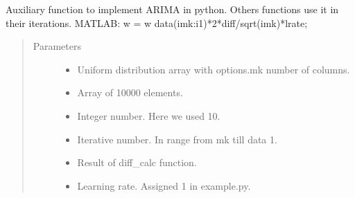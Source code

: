 \documentclass[letterpaper,10pt,english]{sphinxmanual}
\begin{document}
\begin{fulllineitems}
\label{\detokenize{LDS:LDS.OnlineLDS_library.w_calc}}
\sphinxAtStartPar
Auxiliary function to implement ARIMA in python. Others functions use it in their
iterations.
MATLAB: w = w \sphinxhyphen{} data(i\sphinxhyphen{}mk:i\sphinxhyphen{}1)*2*diff/sqrt(i\sphinxhyphen{}mk)*lrate;
\begin{quote}\begin{description}
\item[{Parameters}] \leavevmode\begin{itemize}
\item {} 
\sphinxAtStartPar
{} \textendash{} Uniform distribution array with options.mk number of columns.

\item {} 
\sphinxAtStartPar
{} \textendash{} Array of 10000 elements.

\item {} 
\sphinxAtStartPar
{} \textendash{} Integer number. Here we used 10.

\item {} 
\sphinxAtStartPar
{} \textendash{} Iterative number. In range from mk till data \sphinxhyphen{} 1.

\item {} 
\sphinxAtStartPar
{} \textendash{} Result of diff\_calc function.

\item {} 
\sphinxAtStartPar
{} \textendash{} Learning rate. Assigned 1 in example.py.

\end{itemize}

\end{description}\end{quote}

\end{fulllineitems}

\end{document}
